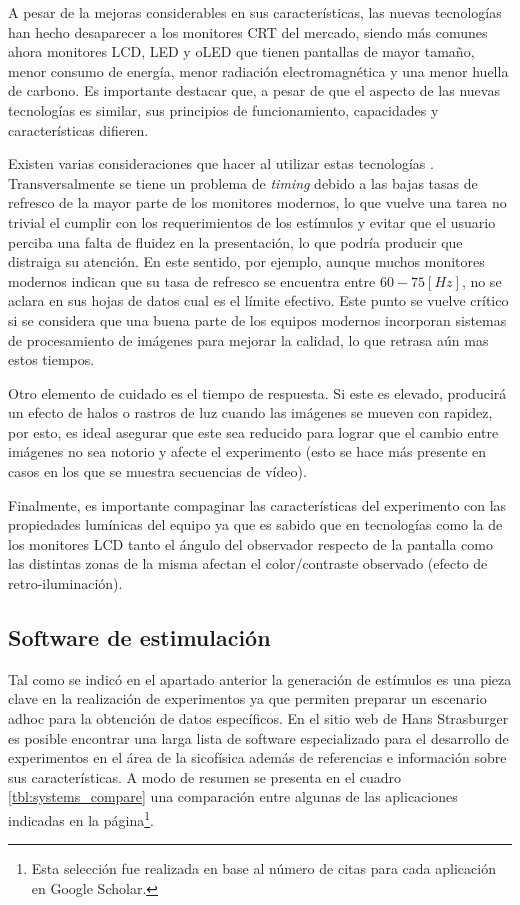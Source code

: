 \documentclass[../main.tex]{subfiles}
\begin{document}
			A pesar de la mejoras considerables en sus características, las nuevas tecnologías han hecho desaparecer a los monitores CRT del mercado, siendo más comunes ahora monitores LCD, LED y oLED que tienen pantallas de mayor tamaño, menor consumo de energía, menor radiación electromagnética y una menor huella de carbono. Es importante destacar que, a pesar de que el aspecto de las nuevas tecnologías es similar, sus principios de funcionamiento, capacidades y características difieren.

			Existen varias consideraciones que hacer al utilizar estas tecnologías \cite{article:monitor_wang, article:monitor_elze}. Transversalmente se tiene un problema de \textit{timing} debido a las bajas tasas de refresco de la mayor parte de los monitores modernos, lo que vuelve una tarea no trivial el cumplir con los requerimientos de los estímulos y evitar que el usuario perciba una falta de fluidez en la presentación, lo que podría producir que distraiga su atención. En este sentido, por ejemplo, aunque muchos monitores modernos indican que su tasa de refresco se encuentra entre $60-75[Hz]$, no se aclara en sus hojas de datos cual es el límite efectivo. Este punto se vuelve crítico si se considera que una buena parte de los equipos modernos incorporan sistemas de procesamiento de imágenes para mejorar la calidad, lo que retrasa aún mas estos tiempos. 

			Otro elemento de cuidado es el tiempo de respuesta. Si este es elevado, producirá un efecto de halos o rastros de luz cuando las imágenes se mueven con rapidez, por esto, es ideal asegurar que este sea reducido para lograr que el cambio entre imágenes no sea notorio y afecte el experimento (esto se hace más presente en casos en los que se muestra secuencias de vídeo). 

			Finalmente, es importante compaginar las características del experimento con las propiedades lumínicas del equipo ya que es sabido que en tecnologías como la de los monitores LCD tanto el ángulo del observador respecto de la pantalla como las distintas zonas de la misma afectan el color/contraste observado (efecto de retro-iluminación). 
			
		\subsection{Software de estimulación}
		\label{sub:02_software_de_estimulacion}

			Tal como se indicó en el apartado anterior la generación de estímulos es una pieza clave en la realización de experimentos ya que permiten preparar un escenario adhoc para la obtención de datos específicos. En el sitio web de Hans Strasburger \cite{website:software} es posible encontrar una larga lista de software especializado para el desarrollo de experimentos en el área de la sicofísica además de referencias e información sobre sus características. A modo de resumen se presenta en el cuadro \ref{tbl:systems_compare} una comparación entre algunas de las aplicaciones indicadas en la página\footnote{Esta selección fue realizada en base al número de citas para cada aplicación en Google Scholar.}.  
			
\end{document}
